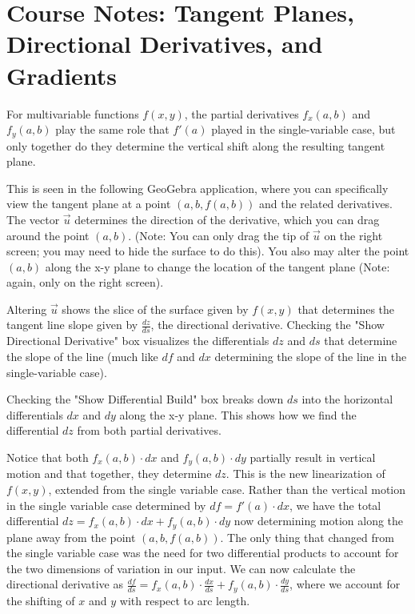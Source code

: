 \documentclass{ximera}
\begin{document}
\section{Course Notes: Tangent Planes, Directional Derivatives, and Gradients}

For multivariable functions $f(x,y)$, the partial derivatives $f_x(a,b)$ and $f_y(a,b)$ play the same role that $f'(a)$ played in the single-variable case, but only together do they determine the vertical shift along the resulting tangent plane.

This is seen in the following GeoGebra application, where you can specifically view the tangent plane at a point $(a,b,f(a,b))$ and the related derivatives. The vector $\vec u$ determines the direction of the derivative, which you can drag around the point $(a,b)$. (Note: You can only drag the tip of $\vec u$ on the right screen; you may need to hide the surface to do this). You also may alter the point $(a,b)$ along the x-y plane to change the location of the tangent plane (Note: again, only on the right screen).

Altering $\vec u$ shows the slice of the surface given by $f(x,y)$ that determines the tangent line slope given by $\frac{dz}{ds}$, the directional derivative. Checking the "Show Directional Derivative" box visualizes the differentials $dz$ and $ds$ that determine the slope of the line (much like $df$ and $dx$ determining the slope of the line in the single-variable case).

\begin{center}
\end{center}

Checking the "Show Differential Build" box breaks down $ds$ into the horizontal differentials $dx$ and $dy$ along the x-y plane. This shows how we find the differential $dz$ from both partial derivatives.

Notice that both $f_x(a,b)\cdot dx$ and $f_y(a,b)\cdot dy$ partially result in vertical motion and that together, they determine $dz$. This is the new linearization of $f(x,y)$, extended from the single variable case. Rather than the vertical motion in the single variable case determined by $df=f'(a)\cdot dx$, we have the total differential $dz=f_x(a,b)\cdot dx+f_y(a,b)\cdot dy$ now determining motion along the plane away from the point $(a,b,f(a,b))$. The only thing that changed from the single variable case was the need for two differential products to account for the two dimensions of variation in our input. We can now calculate the directional derivative as $\frac{df}{ds}=f_x(a,b)\cdot \frac{dx}{ds}+f_y(a,b)\cdot \frac{dy}{ds}$, where we account for the shifting of $x$ and $y$ with respect to arc length.
\end{document}
